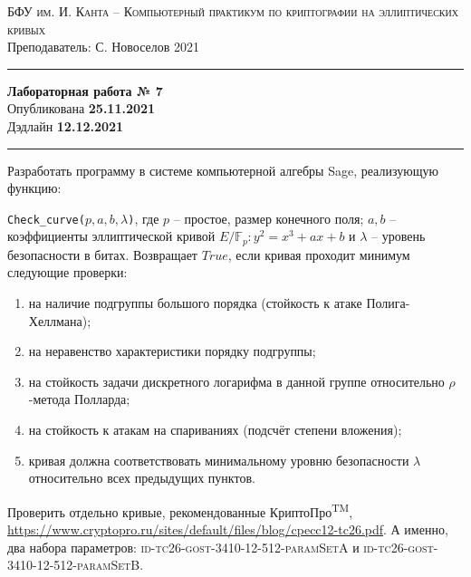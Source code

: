 \documentclass[11pt]{exam}
\theoremstyle{definition}
\begin{document}
	
	{\noindent
		\textsc{БФУ им. И. Канта -- Компьютерный практикум по криптографии на эллиптических кривых }\\[5pt]
		Преподаватель: {С. Новоселов}   \hfill{2021\\}
	\hrule
	\begin{center}
		{\LARGE\textbf{
				Лабораторная работа № 7 \\[5pt]
		}} 
			Опубликована \textbf{25.11.2021} \\[5pt] 
			Дэдлайн \textbf{12.12.2021}
		
	\end{center}
	\hrule \vspace{5mm}
	
	\thispagestyle{empty}
	
	Разработать программу в системе компьютерной алгебры Sage, реализующую функцию:
    
        \texttt{Check\_curve($p, a, b, \lambda$)}, где $p$ -- простое, размер конечного поля; $a, b$ -- коэффициенты эллиптической кривой $E/\mathbb{F}_p: y^2 = x^3 + a x + b$ и  $\lambda$ -- уровень безопасности в битах. Возвращает $True$, если кривая проходит минимум следующие проверки:
        \begin{enumerate}
            \item на наличие подгруппы большого порядка (стойкость к атаке Полига-Хеллмана);
            \item на неравенство характеристики порядку подгруппы;
            \item на стойкость задачи дискретного логарифма в данной группе относительно $\rho$-метода Полларда;
            \item на стойкость к атакам на спариваниях (подсчёт степени вложения);
            \item кривая должна соответствовать минимальному уровню безопасности $\lambda$ относительно всех предыдущих пунктов.
        \end{enumerate}
    
    Проверить отдельно кривые, рекомендованные КриптоПро\textsuperscript{TM}, \url{https://www.cryptopro.ru/sites/default/files/blog/cpecc12-tc26.pdf}. А именно, два набора параметров: \textsc{ id-tc26-gost-3410-12-512-paramSetA} и \textsc{id-tc26-gost-3410-12-512-paramSetB}.
    
    
\normalsize
}
\end{document}
